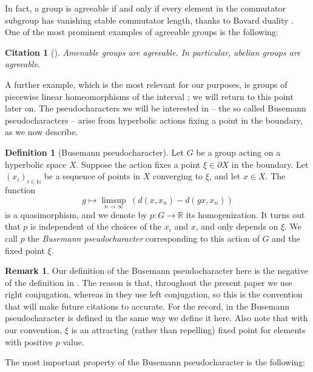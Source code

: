 \documentclass[reqno,12pt]{amsart}\setcounter{tocdepth}{1}
\newtheorem{cit}[theorem]{Citation}
\theoremstyle{definition}
\newtheorem{definition}[theorem]{Definition}
\newtheorem{remark}[theorem]{Remark}
\newcommand{\N}{\mathbb{N}}
\newcommand{\R}{\mathbb{R}}
\numberwithin{equation}{section}
\begin{document}
In fact, a group is agreeable if and only if every element in the commutator subgroup has vanishing stable commutator length, thanks to Bavard duality \cite{bavard91}. One of the most prominent examples of agreeable groups is the following:

\begin{cit}[{\cite[Proposition~2.65]{scl}}]\label{amenable:agreeable}
Amenable groups are agreeable. In particular, abelian groups are agreeable.
\end{cit}

A further example, which is the most relevant for our purposes, is groups of piecewise linear homeomorphisms of the interval \cite{calegari:PL}; we will return to this point later on. The pseudocharacters we will be interested in -- the so called Busemann pseudocharacters -- arise from hyperbolic actions fixing a point in the boundary, as we now describe.

\begin{definition}[Busemann pseudocharacter]
Let $G$ be a group acting on a hyperbolic space $X$. Suppose the action fixes a point $\xi\in\partial X$ in the boundary. Let $(x_i)_{i\in\N}$ be a sequence of points in $X$ converging to $\xi$, and let $x\in X$. The function
\[
g\mapsto \displaystyle \limsup_{n\to\infty} \hspace{3pt} (d(x,x_n) - d(gx,x_n))
\]
is a quasimorphism, and we denote by $p\colon G\to\R$ its homogenization. It turns out that $p$ is independent of the choices of the $x_i$ and $x$, and only depends on $\xi$. We call $p$ the \emph{Busemann pseudocharacter} corresponding to this action of $G$ and the fixed point $\xi$.
\end{definition}

\begin{remark}\label{rem:left_right}
Our definition of the Busemann pseudocharacter here is the negative of the definition in \cite{confining}. The reason is that, throughout the present paper we use right conjugation, whereas in \cite{confining} they use left conjugation, so this is the convention that will make future citations to \cite{confining} accurate. For the record, in \cite{caprace15} the Busemann pseudocharacter is defined in the same way we define it here. Also note that with our convention, $\xi$ is an attracting (rather than repelling) fixed point for elements with positive $p$ value.
\end{remark}

The most important property of the Busemann pseudocharacter is the following:
\end{document}
